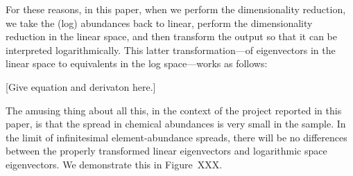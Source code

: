 \documentclass[12pt]{article}
\begin{document}
For these reasons, in this paper, when we perform the dimensionality reduction,
we take the (log) abundances back to linear, perform the dimensionality reduction
in the linear space, and then transform the output so that it can be interpreted
logarithmically.
This latter transformation---of eigenvectors in the linear space to equivalents
in the log space---works as follows:

[Give equation and derivaton here.]

The amusing thing about all this, in the context of the project reported in this paper,
is that the spread in chemical abundances is very small in the sample.
In the limit of infinitesimal element-abundance spreads, there will be no differences
between the properly transformed linear eigenvectors and logarithmic space eigenvectors.
We demonstrate this in Figure~XXX.
\end{document}
